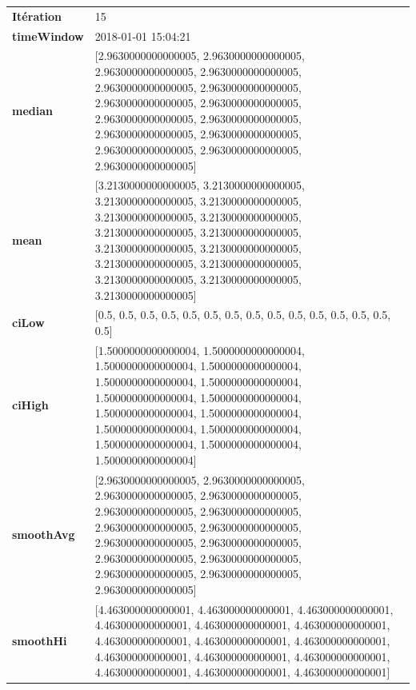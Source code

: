 \begin{table}[H]
	\centering
	\begin{tabularx}{\textwidth}{lX}
		\textbf{Itération}&15 \\
		\textbf{timeWindow}	 & 2018-01-01 15:04:21   \\
		\textbf{median} & [2.9630000000000005, 2.9630000000000005, 2.9630000000000005, 2.9630000000000005, 2.9630000000000005, 2.9630000000000005, 2.9630000000000005, 2.9630000000000005, 2.9630000000000005, 2.9630000000000005, 2.9630000000000005, 2.9630000000000005, 2.9630000000000005, 2.9630000000000005, 2.9630000000000005] 
		\\ 
		\textbf{mean} & [3.2130000000000005, 3.2130000000000005, 3.2130000000000005, 3.2130000000000005, 3.2130000000000005, 3.2130000000000005, 3.2130000000000005, 3.2130000000000005, 3.2130000000000005, 3.2130000000000005, 3.2130000000000005, 3.2130000000000005, 3.2130000000000005, 3.2130000000000005, 3.2130000000000005] 
		\\
		\textbf{ciLow} &  [0.5, 0.5, 0.5, 0.5, 0.5, 0.5, 0.5, 0.5, 0.5, 0.5, 0.5, 0.5, 0.5, 0.5, 0.5]  \\
		\textbf{ciHigh}& [1.5000000000000004, 1.5000000000000004, 1.5000000000000004, 1.5000000000000004, 1.5000000000000004, 1.5000000000000004, 1.5000000000000004, 1.5000000000000004, 1.5000000000000004, 1.5000000000000004, 1.5000000000000004, 1.5000000000000004, 1.5000000000000004, 1.5000000000000004, 1.5000000000000004] 
		\\
		\textbf{smoothAvg} & [2.9630000000000005, 2.9630000000000005, 2.9630000000000005, 2.9630000000000005, 2.9630000000000005, 2.9630000000000005, 2.9630000000000005, 2.9630000000000005, 2.9630000000000005, 2.9630000000000005, 2.9630000000000005, 2.9630000000000005, 2.9630000000000005, 2.9630000000000005, 2.9630000000000005] 
		\\
		\textbf{smoothHi} & [4.463000000000001, 4.463000000000001, 4.463000000000001, 4.463000000000001, 4.463000000000001, 4.463000000000001, 4.463000000000001, 4.463000000000001, 4.463000000000001, 4.463000000000001, 4.463000000000001, 4.463000000000001, 4.463000000000001, 4.463000000000001, 4.463000000000001] 
		\\
	\end{tabularx} 
\end{table}

